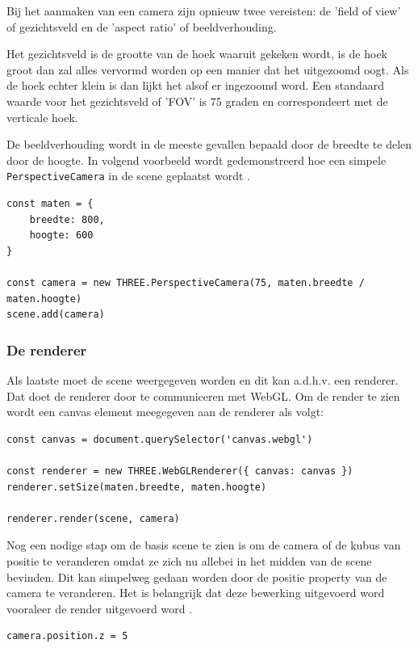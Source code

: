 Bij het aanmaken van een camera zijn opnieuw twee vereisten: de 'field of view' of gezichtsveld en de 'aspect ratio' of beeldverhouding. 

Het gezichtsveld is de grootte van de hoek waaruit gekeken wordt, is de hoek groot dan zal alles vervormd worden op een manier dat het uitgezoomd oogt. Als de hoek echter klein is dan lijkt het alsof er ingezoomd word. Een standaard waarde voor het gezichtsveld of 'FOV' is 75 graden en correspondeert met de verticale hoek.

De beeldverhouding wordt in de meeste gevallen bepaald door de breedte te delen door de hoogte. In volgend voorbeeld wordt gedemonstreerd hoe een simpele \texttt{PerspectiveCamera} in de scene geplaatst wordt \autocite{Simon2023}.

\begin{lstlisting}
const maten = {
	breedte: 800,
	hoogte: 600
}

const camera = new THREE.PerspectiveCamera(75, maten.breedte / maten.hoogte)
scene.add(camera)
\end{lstlisting}

\subsubsection{De renderer}

Als laatste moet de scene weergegeven worden en dit kan a.d.h.v. een renderer. Dat doet de renderer door te communiceren met WebGL. Om de render te zien wordt een canvas element meegegeven aan de renderer als volgt: 

\begin{lstlisting}
const canvas = document.querySelector('canvas.webgl')

const renderer = new THREE.WebGLRenderer({ canvas: canvas })
renderer.setSize(maten.breedte, maten.hoogte)

renderer.render(scene, camera)
\end{lstlisting}

Nog een nodige stap om de basis scene te zien is om de camera of de kubus van positie te veranderen omdat ze zich nu allebei in het midden van de scene bevinden. Dit kan simpelweg gedaan worden door de positie property van de camera te veranderen. Het is belangrijk dat deze bewerking uitgevoerd word vooraleer de render uitgevoerd word \autocite{Simon2023}.

\begin{lstlisting}
camera.position.z = 5
\end{lstlisting}

